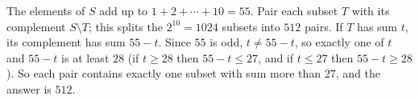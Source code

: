 The elements of $S$ add up to $1+2+\cdots+10=55$. Pair each subset $T$ with its complement $S\setminus T$; this splits the $2^{10}=1024$ subsets into $512$ pairs. If $T$ has sum $t$, its complement has sum $55-t$. Since $55$ is odd, $t\ne55-t$, so exactly one of $t$ and $55-t$ is at least $28$ (if $t\ge28$ then $55-t\le27$, and if $t\le27$ then $55-t\ge28$). So each pair contains exactly one subset with sum more than $27$, and the answer is $\boxed{512}$.
